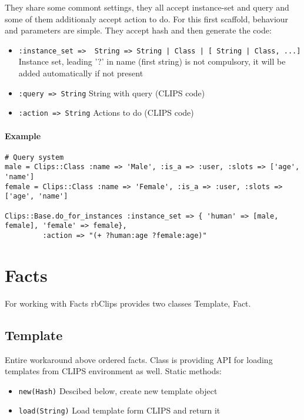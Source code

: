 \documentclass[a4paper,10pt]{article}
\begin{document}
They share some commont settings, they all accept instance-set and query and some of them additionaly accept action to do. For this first scaffold, behaviour and parameters are simple. They accept hash and then generate the code:
\begin{itemize}
 \item \texttt{:instance\_set => { String => String | Class | [ String | Class, ...]}} Instance set, leading '?' in name (first string) is not compulsory, it will be added automatically if not present
 \item \texttt{:query => String} String with query (CLIPS code)
 \item \texttt{:action => String} Actions to do (CLIPS code)
\end{itemize}

\paragraph{Example}
\begin{verbatim}
# Query system
male = Clips::Class :name => 'Male', :is_a => :user, :slots => ['age', 'name']
female = Clips::Class :name => 'Female', :is_a => :user, :slots => ['age', 'name']

Clips::Base.do_for_instances :instance_set => { 'human' => [male, female], 'female' => female},
         :action => "(+ ?human:age ?female:age)"
\end{verbatim}

\section{Facts}
For working with Facts rbClips provides two classes Template, Fact.

\subsection{Template}
Entire workaround above ordered facts. Class is providing API for loading templates from CLIPS environment as well. Static methods:
\begin{itemize}
 \item \texttt{new(Hash)} Descibed below, create new template object
 \item \texttt{load(String)} Load template form CLIPS and return it
\end{itemize}
\end{document}
